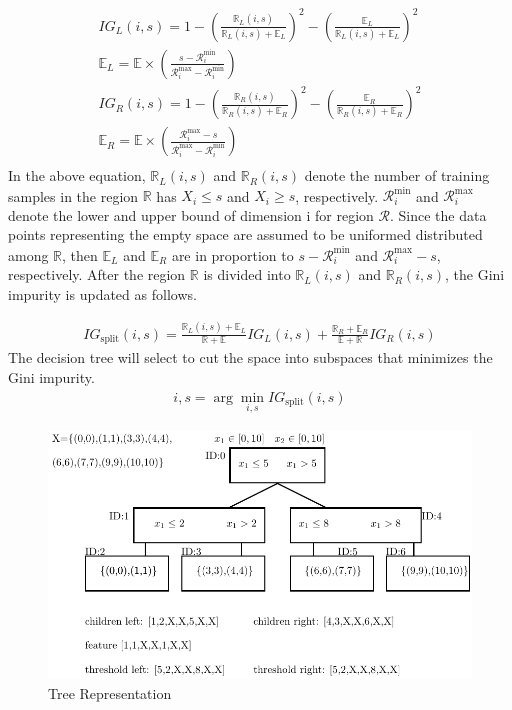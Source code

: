 \documentclass[11pt,onecolumn]{IEEEtran}
\begin{document}
\begin{align*}
IG_L(i,s)=1-\left(\frac{\mathbb R_L(i,s)}{\mathbb R_L(i,s)+\mathbb E_L}\right)^2-\left(\frac{\mathbb E_L}{\mathbb R_L(i,s)+ \mathbb E_L}\right)^2\\
\mathbb E_L=\mathbb E\times \left(\frac{s- \mathcal R^{\mbox{min}}_i}{\mathcal R^{\mbox{max}}_i-\mathcal R^{\mbox{min}}_i}\right)\\
IG_R(i,s)=1-\left(\frac{\mathbb  R_R(i,s)}{\mathbb  R_R(i,s)+\mathbb  E_R}\right)^2-\left(\frac{\mathbb  E_R}{\mathbb R_R(i,s)+\mathbb  E_R}\right)^2\\
\mathbb E_R=\mathbb E\times \left(\frac{\mathcal R_i^{\mbox{max}}-s}{\mathcal R_i^{\mbox{max}}-\mathcal R_i^{\mbox{min}}}\right)\\
\end{align*}
In the above equation,  $\mathbb R_L(i,s)$ and $\mathbb R_R(i,s)$  denote the number of training samples in the region $\mathbb R$ has  $X_i\leq s$ and $X_i\geq s$, respectively. $\mathcal R^{\mbox{min}}_i$ and  $\mathcal R^{\mbox{max}}_i$ denote the lower and upper bound of dimension i for region $\mathcal R$. Since the data points representing the empty space are assumed to be uniformed distributed among $\mathbb R$, then $\mathbb E_L$ and $\mathbb E_R$  are in  proportion to $s- \mathcal R^{\mbox{min}}_i$ and $\mathcal R_i^{\mbox{max}}-s$, respectively.
After the region $\mathbb R$ is divided into $\mathbb R_L(i,s)$ and $\mathbb R_R(i,s)$, the Gini impurity is updated as follows.

\begin{align*}
IG_{\mbox{split}}(i,s)=\frac{\mathbb R_L(i,s)+\mathbb E_L}{\mathbb R+ \mathbb E}IG_L(i,s)+\frac{\mathbb R_R+ \mathbb E_R}{\mathbb E+\mathbb R}IG_R(i,s)
\end{align*}
The decision tree will select to cut the space into subspaces  that minimizes the  Gini impurity.
\begin{align*}
i,s=\arg \min_{i,s} IG_{\mbox{split}}(i,s)
\end{align*}

  \begin{figure}[h]
    \centering
    \includegraphics[scale=1]{image/tree.pdf} 
    \caption{Tree Representation}
    \label{fig:ExampleTree1}
    \end{figure}
\end{document}
